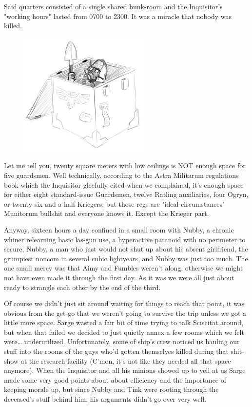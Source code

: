 Said quarters consisted of a single shared bunk-room and the Inquisitor's "working hours" lasted from 0700 to 2300. 
It was a miracle that nobody was killed.

\begin{figure}
	\begin{center}
		\includegraphics[width=\figwidth]{pics/17/22.png}
	\end{center}
\end{figure}
Let me tell you, twenty square meters with low ceilings is NOT enough space for five guardsmen. 
Well technically, according to the Astra Militarum regulations book which the Inquisitor gleefully cited when we complained, it's enough space for either eight standard-issue Guardsmen, twelve Ratling auxiliaries, four Ogryn, or twenty-six and a half Kriegers, but those regs are "ideal circumstances" Munitorum bullshit and everyone knows it. 
Except the Krieger part.

Anyway, sixteen hours a day confined in a small room with Nubby, a chronic whiner relearning basic las-gun use, a hyperactive paranoid with no perimeter to secure, Nubby, a man who just would not shut up about his absent girlfriend, the grumpiest noncom in several cubic lightyears, and Nubby was just too much. 
The one small mercy was that Aimy and Fumbles weren't along, otherwise we might not have even made it through the first day. 
As it was we were all just about ready to strangle each other by the end of the third.

Of course we didn't just sit around waiting for things to reach that point, it was obvious from the get-go that we weren't going to survive the trip unless we got a little more space. 
Sarge wasted a fair bit of time trying to talk Sciscitat around, but when that failed we decided to just quietly annex a few rooms which we felt were… underutilized. 
Unfortunately, some of ship's crew noticed us hauling our stuff into the rooms of the guys who'd gotten themselves killed during that shit-show at the research facility (C'mon, it's not like they needed all that space anymore). 
When the Inquisitor and all his minions showed up to yell at us Sarge made some very good points about about efficiency and the importance of keeping morale up, but since Nubby and Tink were rooting through the deceased's stuff behind him, his arguments didn't go over very well.

